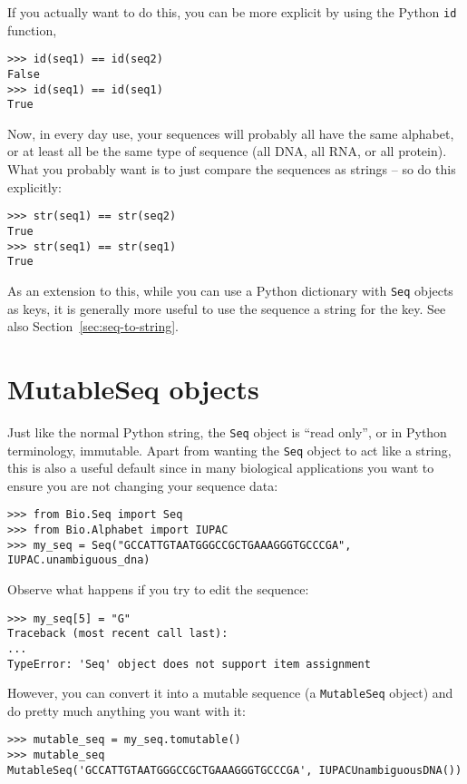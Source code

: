 \documentclass{report}
\begin{document}
If you actually want to do this, you can be more explicit by using the Python
\verb|id| function,
\begin{verbatim}
>>> id(seq1) == id(seq2)
False
>>> id(seq1) == id(seq1)
True
\end{verbatim}

Now, in every day use, your sequences will probably all have the same
alphabet, or at least all be the same type of sequence (all DNA, all RNA, or
all protein). What you probably want is to just compare the sequences as
strings -- so do this explicitly:
\begin{verbatim}
>>> str(seq1) == str(seq2)
True
>>> str(seq1) == str(seq1)
True
\end{verbatim}

\noindent As an extension to this, while you can use a Python dictionary with
\verb|Seq| objects as keys, it is generally more useful to use the sequence a
string for the key. See also Section~\ref{sec:seq-to-string}.

\section{MutableSeq objects}
\label{sec:mutable-seq}

Just like the normal Python string, the \verb|Seq| object is ``read only'', or in Python terminology, immutable.  Apart from wanting the \verb|Seq| object to act like a string, this is also a useful default since in many biological applications you want to ensure you are not changing your sequence data:

\begin{verbatim}
>>> from Bio.Seq import Seq
>>> from Bio.Alphabet import IUPAC
>>> my_seq = Seq("GCCATTGTAATGGGCCGCTGAAAGGGTGCCCGA", IUPAC.unambiguous_dna)
\end{verbatim}

Observe what happens if you try to edit the sequence:
\begin{verbatim}
>>> my_seq[5] = "G"
Traceback (most recent call last):
...
TypeError: 'Seq' object does not support item assignment
\end{verbatim}

However, you can convert it into a mutable sequence (a \verb|MutableSeq| object) and do pretty much anything you want with it:

\begin{verbatim}
>>> mutable_seq = my_seq.tomutable()
>>> mutable_seq
MutableSeq('GCCATTGTAATGGGCCGCTGAAAGGGTGCCCGA', IUPACUnambiguousDNA())
\end{verbatim}
\end{document}
